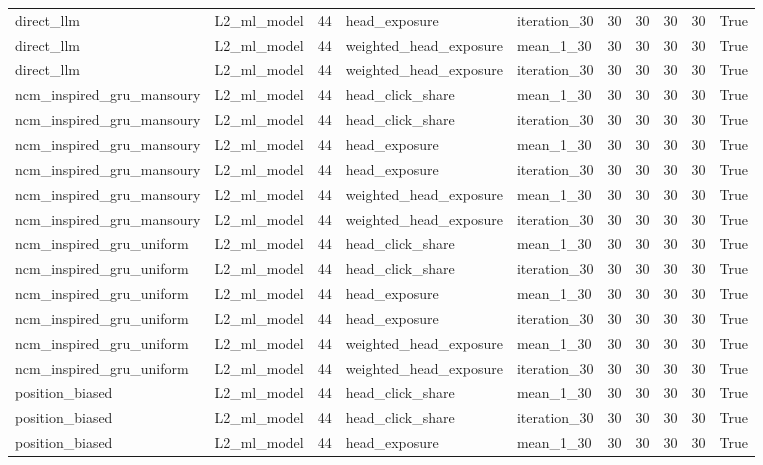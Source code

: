 \begin{table}[htbp!]
\begin{tabular}{llrllrrrrr}
direct\_llm & L2\_ml\_model & 44 & head\_exposure & iteration\_30 & 30 & 30 & 30 & 30 & True \\
direct\_llm & L2\_ml\_model & 44 & weighted\_head\_exposure & mean\_1\_30 & 30 & 30 & 30 & 30 & True \\
direct\_llm & L2\_ml\_model & 44 & weighted\_head\_exposure & iteration\_30 & 30 & 30 & 30 & 30 & True \\
ncm\_inspired\_gru\_mansoury & L2\_ml\_model & 44 & head\_click\_share & mean\_1\_30 & 30 & 30 & 30 & 30 & True \\
ncm\_inspired\_gru\_mansoury & L2\_ml\_model & 44 & head\_click\_share & iteration\_30 & 30 & 30 & 30 & 30 & True \\
ncm\_inspired\_gru\_mansoury & L2\_ml\_model & 44 & head\_exposure & mean\_1\_30 & 30 & 30 & 30 & 30 & True \\
ncm\_inspired\_gru\_mansoury & L2\_ml\_model & 44 & head\_exposure & iteration\_30 & 30 & 30 & 30 & 30 & True \\
ncm\_inspired\_gru\_mansoury & L2\_ml\_model & 44 & weighted\_head\_exposure & mean\_1\_30 & 30 & 30 & 30 & 30 & True \\
ncm\_inspired\_gru\_mansoury & L2\_ml\_model & 44 & weighted\_head\_exposure & iteration\_30 & 30 & 30 & 30 & 30 & True \\
ncm\_inspired\_gru\_uniform & L2\_ml\_model & 44 & head\_click\_share & mean\_1\_30 & 30 & 30 & 30 & 30 & True \\
ncm\_inspired\_gru\_uniform & L2\_ml\_model & 44 & head\_click\_share & iteration\_30 & 30 & 30 & 30 & 30 & True \\
ncm\_inspired\_gru\_uniform & L2\_ml\_model & 44 & head\_exposure & mean\_1\_30 & 30 & 30 & 30 & 30 & True \\
ncm\_inspired\_gru\_uniform & L2\_ml\_model & 44 & head\_exposure & iteration\_30 & 30 & 30 & 30 & 30 & True \\
ncm\_inspired\_gru\_uniform & L2\_ml\_model & 44 & weighted\_head\_exposure & mean\_1\_30 & 30 & 30 & 30 & 30 & True \\
ncm\_inspired\_gru\_uniform & L2\_ml\_model & 44 & weighted\_head\_exposure & iteration\_30 & 30 & 30 & 30 & 30 & True \\
position\_biased & L2\_ml\_model & 44 & head\_click\_share & mean\_1\_30 & 30 & 30 & 30 & 30 & True \\
position\_biased & L2\_ml\_model & 44 & head\_click\_share & iteration\_30 & 30 & 30 & 30 & 30 & True \\
position\_biased & L2\_ml\_model & 44 & head\_exposure & mean\_1\_30 & 30 & 30 & 30 & 30 & True \\

\end{tabular}
\end{table}

